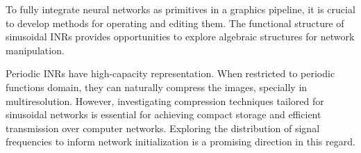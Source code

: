 



To fully integrate neural networks as primitives in a graphics pipeline, it is crucial to develop methods for operating and editing them. The functional structure of sinusoidal INRs provides opportunities to explore algebraic structures for network manipulation. 


Periodic INRs have high-capacity representation. When restricted to periodic functions domain, they can naturally compress the images, specially in multiresolution. However, investigating compression techniques tailored for sinusoidal networks is essential for achieving compact storage and efficient transmission over computer networks. Exploring the distribution of signal frequencies to inform network initialization is a promising direction in this regard.




